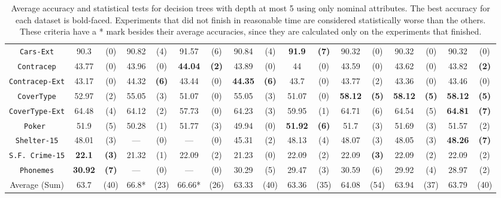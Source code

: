 \begin{sidewaystable*}[ph!]
\begin{tabular}{c|cc|cc|cc|cc|cc|cc|cc|cc}
{\tt Cars-Ext}      & 90.3     & (0)    & 90.82    & (4)    & 91.57    & (6)    & 90.84    & (4)    &{\bf 91.9}&{\bf(7)}& 90.32    & (0)              & 90.32    & (0)      & 90.32    & (0)      \\
{\tt Contracep}     & 43.77    & (0)    & 43.96    & (0)    &{\bf44.04}&{\bf(2)}& 43.89    & (0)    & 44       & (0)    & 43.59    & (0)              & 43.62    & (0)      & 43.82    & {\bf(2)} \\
{\tt Contracep-Ext} & 43.17    & (0)    & 44.32    &{\bf(6)}& 43.44    & (0)    &{\bf44.35}&{\bf(6)}& 43.7     & (0)    & 43.77    & (2)              & 43.36    & (0)      & 43.46    & (0)      \\
{\tt CoverType}     & 52.97    & (2)    & 55.05    & (3)    & 51.07    & (0)    & 55.05    & (3)    & 51.07    & (0)    &{\bf58.12}&{\bf(5)}          &{\bf58.12}& {\bf(5)} &{\bf58.12}& {\bf(5)} \\
{\tt CoverType-Ext} & 64.48    & (4)    & 64.12    & (2)    & 57.73    & (0)    & 64.23    & (3)    & 59.95    & (1)    & 64.71    & (6)              & 64.54    & (5)      &{\bf64.81}& {\bf(7)} \\
{\tt Poker }        & 51.9     & (5)    & 50.28    & (1)    & 51.77    & (3)    & 49.94    & (0)    &{\bf51.92}&{\bf(6)}& 51.7     & (3)              & 51.69    & (3)      & 51.57    & (2)      \\
{\tt Shelter-15}    & 48.01    & (3)    & ---      & (0)    & ---      & (0)    & 45.31    & (2)    & 48.13    & (4)    & 48.07    & (3)              & 48.05    & (3)      &{\bf48.26}& {\bf(7)} \\  
{\tt S.F. Crime-15} &{\bf22.1} &{\bf(3)}& 21.32    & (1)    & 22.09    & (2)    & 21.23    & (0)    & 22.09    & (2)    & 22.09    &{\bf(3)}          & 22.09    & (2)      & 22.09    & (2)      \\
{\tt Phonemes}      &{\bf30.92}&{\bf(7)}& ---      & (0)    & ---      & (0)    & 30.29    & (5)    & 29.47    & (3)    & 30.59    & (6)              & 29.92    & (4)      & 28.97    & (2)      \\
\hline
Average (Sum)       &  63.7    & (40)   & 66.8*    & (23)   & 66.66*   & (26)   & 63.33    & (40)   & 63.36    & (35)   & 64.08    & (54)             & 63.94    & (37)     & 63.79    & (40)

\end{tabular}
\caption{Average accuracy and statistical tests  for  decision trees with depth at most 5 using only nominal attributes. The best accuracy for each dataset is bold-faced. Experiments that did not finish in reasonable time are considered statistically worse than the others. These criteria have a * mark besides their average accuracies, since they are calculated only on the experiments that finished.}
\label{tab:nominal-5}
\normalsize
\end{sidewaystable*}


